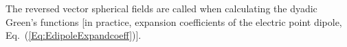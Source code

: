 \documentclass[journal=jacsat,manuscript=article,layout=traditional]{achemso}
\begin{document}
The reversed vector spherical fields are called when calculating the dyadic Green's functions [in practice, expansion coefficients of the electric point dipole, Eq.~(\ref{Eq:EdipoleExpandcoeff})].
\newpage

\newpage

\end{document}
